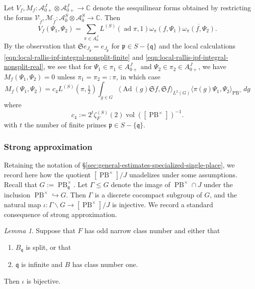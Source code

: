 \documentclass[reqno,10pt]{amsart}
\theoremstyle{plain} %
\theoremstyle{definition}
\theoremstyle{plain} %
\theoremstyle{remark}
\theoremstyle{itplain} %
\newtheorem*{lemma*}{Lemma}
\theoremstyle{remark} %
\renewcommand{\leq}{\leqslant}
\numberwithin{equation}{section}
\DeclareMathOperator{\ad}{ad}
\DeclareMathOperator{\Ad}{Ad}
\def\PB{\operatorname{PB}}
\DeclareMathOperator{\vol}{vol}
\begin{document}
Let $V_{f}, M_{f} : \mathcal{A}_{0+}^J \otimes \mathcal{A}_{0+}^J \rightarrow \mathbb{C}$ denote the sesquilinear forms obtained by restricting the forms $\mathcal{V}_{\tilde{f}}, \mathcal{M}_{\tilde{f}} : \mathcal{A}_0^S \otimes \mathcal{A}_0^S \rightarrow \mathbb{C}$.  Then
\begin{equation}
  V_{f}(\Psi_1,\Psi_2)
  =
  \sum_{\pi \in A_0^J}
  L^{(S)}(\ad \pi,1)
  \omega_\pi(f,\Psi_1)
  \overline{\omega_\pi(f,\Psi_2)}.
\end{equation}
By the observation that $\mathfrak{S} e_{J_\mathfrak{p} } = e_{J_\mathfrak{p}}$ for $\mathfrak{p} \in S - \{\mathfrak{q}\}$ and the local calculations \eqref{eqn:local-rallis-ipf-integral-nonsplit-finite} and \eqref{eqn:local-rallis-ipf-integral-nonsplit-real}, we see that for $\Psi_1 \in \pi_1 \in A_{0+}^J$ and $\Psi_2 \in \pi_2 \in A_{0+}^J$, we have $M_{f}(\Psi_1,\Psi_2) = 0$ unless $\pi_1 = \pi_2 =: \pi$, in which case
\begin{equation}
  M_{f}(\Psi_1,\Psi_2)
  =
  c_4
  L^{(S)}(\pi,\tfrac{1}{2})
  \int_{g \in G}
  \langle \Ad(g) \mathfrak{S} f, \mathfrak{S} f \rangle_{L^2(G)}
  \langle \pi(g) \Psi_1, \Psi_2 \rangle_{\PB^\times} \,d g 
\end{equation}
where
\begin{equation}\label{eq:defn-of-c4}
  c_4 := 2^t
  \zeta_F^{(S)}(2) \vol([\PB^\times])^{-1}.
\end{equation}
with $t$ the number of finite primes $\mathfrak{p} \in S - \{\mathfrak{q}\}$.

\subsubsection{Strong approximation\label{sec:strong-approx}}
\label{sec-4-4-2}
Retaining the notation of \S\ref{sec:general-estimates-specialized-single-place}, we record here how the quotient $[\PB^\times]/J$ unadelizes under some assumptions.  Recall that $G := \PB^\times_{\mathfrak{q}}$.  Let $\Gamma \leq G$ denote the image of $\PB^\times \cap J$ under the inclusion $\PB^\times \hookrightarrow G$.  Then $\Gamma$ is a discrete cocompact subgroup of $G$, and the natural map $\iota : \Gamma \backslash G \rightarrow [\PB^\times]/J$
is injective.  We record a standard consequence of strong approximation.
\begin{lemma*}\label{lem:consequence-of-strong-approx}
  Suppose that $F$ has odd narrow class number and either that
  \begin{enumerate}
  \item $B_\mathfrak{q}$ is split, or that
  \item $\mathfrak{q}$ is infinite and $B$ has class number one.
  \end{enumerate}
  Then $\iota$ is bijective.
\end{lemma*}
\end{document}
